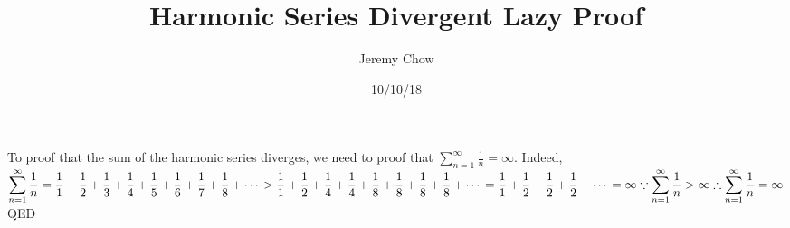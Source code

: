 \documentclass[12pt]{article}
\title{Harmonic Series Divergent Lazy Proof}
\author{Jeremy Chow}
\date{10/10/18}
\begin{document}
\maketitle

To proof that the sum of the harmonic series diverges, we need to proof that $\displaystyle\sum_{n=1}^{\infty}{\frac{1}{n}}=\infty$. Indeed, $\displaystyle\sum_{n=1}^{\infty}{\frac{1}{n}}\\=\frac{1}{1}+\frac{1}{2}+\frac{1}{3}+\frac{1}{4}+\frac{1}{5}+\frac{1}{6}+\frac{1}{7}+\frac{1}{8}+\dotsb\\\\>\frac{1}{1}+\frac{1}{2}+\frac{1}{4}+\frac{1}{4}+\frac{1}{8}+\frac{1}{8}+\frac{1}{8}+\frac{1}{8}+\dotsb\\\\=\frac{1}{1}+\frac{1}{2}+\frac{1}{2}+\frac{1}{2}+\dotsb\\\\=\infty\\\\\because\displaystyle\sum_{n=1}^{\infty}{\frac{1}{n}}>\infty\\\\\therefore\displaystyle\sum_{n=1}^{\infty}{\frac{1}{n}}=\infty\\\\$QED
\end{document}
